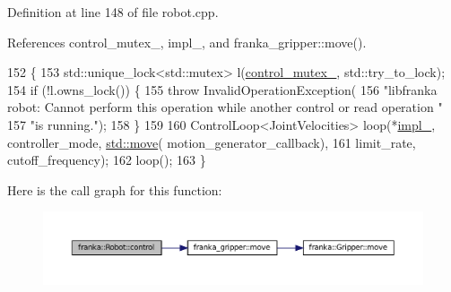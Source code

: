 Definition at line 148 of file robot.\+cpp.



References control\+\_\+mutex\+\_\+, impl\+\_\+, and franka\+\_\+gripper\+::move().


\begin{DoxyCode}
152                              \{
153   std::unique\_lock<std::mutex> l(\hyperlink{classfranka_1_1Robot_a719ad1fab76f8edfc9f6f761671c1375}{control\_mutex\_}, std::try\_to\_lock);
154   \textcolor{keywordflow}{if} (!l.owns\_lock()) \{
155     \textcolor{keywordflow}{throw} InvalidOperationException(
156         \textcolor{stringliteral}{"libfranka robot: Cannot perform this operation while another control or read operation "}
157         \textcolor{stringliteral}{"is running."});
158   \}
159 
160   ControlLoop<JointVelocities> loop(*\hyperlink{classfranka_1_1Robot_aca155054184e5b6478942fd6a1b82ba4}{impl\_}, controller\_mode, \hyperlink{namespacefranka__gripper_a1356a87108d2229401d3755bd3e53bdf}{std::move}(
      motion\_generator\_callback),
161                                     limit\_rate, cutoff\_frequency);
162   loop();
163 \}
\end{DoxyCode}
Here is the call graph for this function\+:
\nopagebreak
\begin{figure}[H]
\begin{center}
\leavevmode
\includegraphics[width=350pt]{classfranka_1_1Robot_a7b2856e3c3c7a5582fd16f7414c30221_cgraph}
\end{center}
\end{figure}
\mbox{\label{classfranka_1_1Robot_a6e59bd7b50b2de2e9e54f0b60d1a552e}} 
